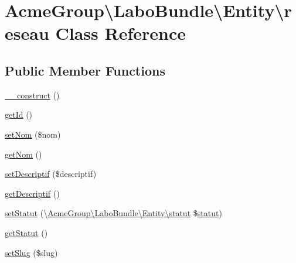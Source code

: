 \hypertarget{class_acme_group_1_1_labo_bundle_1_1_entity_1_1reseau}{\section{Acme\+Group\textbackslash{}Labo\+Bundle\textbackslash{}Entity\textbackslash{}reseau Class Reference}
\label{class_acme_group_1_1_labo_bundle_1_1_entity_1_1reseau}
}
\subsection*{Public Member Functions}
\begin{DoxyCompactItemize}
\item 
\hyperlink{class_acme_group_1_1_labo_bundle_1_1_entity_1_1reseau_a1fd4fcc3c24b108da38f17ec5e6a1139}{\+\_\+\+\_\+construct} ()
\item 
\hyperlink{class_acme_group_1_1_labo_bundle_1_1_entity_1_1reseau_ac85f158bd081a3f9b100e3da17aaa302}{get\+Id} ()
\item 
\hyperlink{class_acme_group_1_1_labo_bundle_1_1_entity_1_1reseau_aafb31a03f51a2c58bac8071b08257518}{set\+Nom} (\$nom)
\item 
\hyperlink{class_acme_group_1_1_labo_bundle_1_1_entity_1_1reseau_acc9ab485118fab2f584264aa417d7352}{get\+Nom} ()
\item 
\hyperlink{class_acme_group_1_1_labo_bundle_1_1_entity_1_1reseau_a4e50433ea2bacd1f38fe54f74c02512b}{set\+Descriptif} (\$descriptif)
\item 
\hyperlink{class_acme_group_1_1_labo_bundle_1_1_entity_1_1reseau_a538947209945c37a5e357414c29a0961}{get\+Descriptif} ()
\item 
\hyperlink{class_acme_group_1_1_labo_bundle_1_1_entity_1_1reseau_a96e70877775ac3aaadee06f272d67e52}{set\+Statut} (\textbackslash{}\hyperlink{class_acme_group_1_1_labo_bundle_1_1_entity_1_1statut}{Acme\+Group\textbackslash{}\+Labo\+Bundle\textbackslash{}\+Entity\textbackslash{}statut} \$\hyperlink{class_acme_group_1_1_labo_bundle_1_1_entity_1_1statut}{statut})
\item 
\hyperlink{class_acme_group_1_1_labo_bundle_1_1_entity_1_1reseau_a2303ba4e4af29d0fe6267a24482c3bae}{get\+Statut} ()
\item 
\hyperlink{class_acme_group_1_1_labo_bundle_1_1_entity_1_1reseau_a5e98cec2de58dcf744deace42ee7483e}{set\+Slug} (\$slug)
\item 

\end{DoxyCompactItemize}

